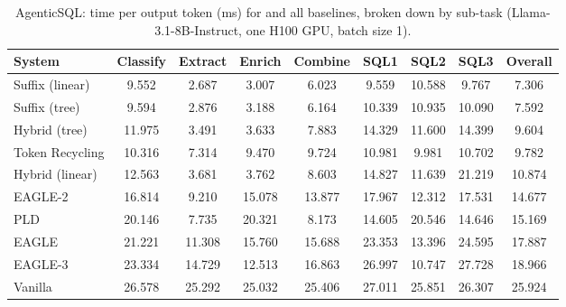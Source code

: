 \begin{table}[htbp]
\centering
\caption{AgenticSQL: time per output token (ms) for \SuffixDecoding and all baselines, broken down by sub-task (Llama-3.1-8B-Instruct, one H100 GPU, batch size 1).}
\label{suffixdecoding:tab:sql-tpot}
\small
\begin{adjustbox}{width=\linewidth}
\begin{tabular}{lcccccccc}
\toprule
\textbf{System} & Classify & Extract & Enrich & Combine & SQL1 & SQL2 & SQL3 & \textbf{Overall} \\
\midrule
Suffix (linear) & 9.552 & 2.687 & 3.007 & 6.023 & 9.559 & 10.588 & 9.767 & 7.306 \\
Suffix (tree) & 9.594 & 2.876 & 3.188 & 6.164 & 10.339 & 10.935 & 10.090 & 7.592 \\
Hybrid (tree) & 11.975 & 3.491 & 3.633 & 7.883 & 14.329 & 11.600 & 14.399 & 9.604 \\
Token Recycling & 10.316 & 7.314 & 9.470 & 9.724 & 10.981 & 9.981 & 10.702 & 9.782 \\
Hybrid (linear) & 12.563 & 3.681 & 3.762 & 8.603 & 14.827 & 11.639 & 21.219 & 10.874 \\
EAGLE-2 & 16.814 & 9.210 & 15.078 & 13.877 & 17.967 & 12.312 & 17.531 & 14.677 \\
PLD & 20.146 & 7.735 & 20.321 & 8.173 & 14.605 & 20.546 & 14.646 & 15.169 \\
EAGLE & 21.221 & 11.308 & 15.760 & 15.688 & 23.353 & 13.396 & 24.595 & 17.887 \\
EAGLE-3 & 23.334 & 14.729 & 12.513 & 16.863 & 26.997 & 10.747 & 27.728 & 18.966 \\
Vanilla & 26.578 & 25.292 & 25.032 & 25.406 & 27.011 & 25.851 & 26.307 & 25.924 \\
\bottomrule
\end{tabular}
\end{adjustbox}
\end{table}

